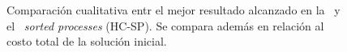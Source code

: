 \documentclass[../informe2.tex]{subfiles}
\begin{document}
\begin{figure}[h]
	\caption{\small Comparación cualitativa entr el mejor resultado alcanzado en la \roadef\ y el \hillc\ \textit{sorted processes} (HC-SP). Se compara además en relación al costo total de la solución inicial.}\label{fig:comparativa-hc-best-challenge}
\end{figure}
\end{document}

